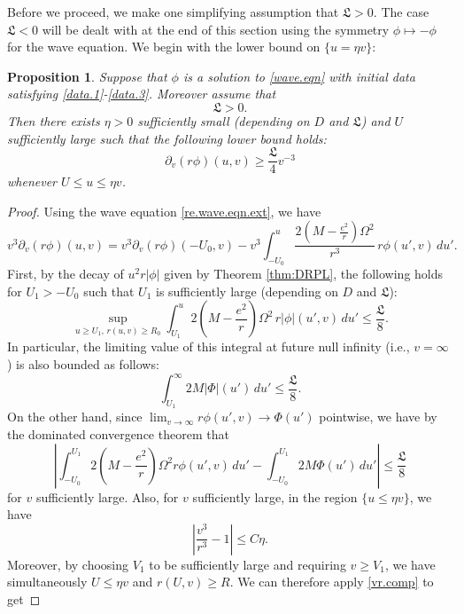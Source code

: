 \documentclass[12 pt, reqno]{amsart}
\newtheorem{proposition}[theorem]{Proposition}
\theoremstyle{definition}
\theoremstyle{remark}
\numberwithin{equation}{section}
\newcommand{\rd}{\partial}
\newcommand{\0}{\emptyset}
\newcommand{\Omg}{\Omega}
\newcommand{\f}{\frac}
\begin{document}
Before we proceed, we make one simplifying assumption that $\mathfrak L>0$. The case $\mathfrak L<0$ will be dealt with at the end of this section using the symmetry $\phi\mapsto -\phi$ for the wave equation. We begin with the lower bound on $\{u=\eta v\}$:
\begin{proposition}\label{decay.far}
Suppose that $\phi$ is a solution to \eqref{wave.eqn} with initial data satisfying \eqref{data.1}-\eqref{data.3}. Moreover assume that 
$$\mathfrak L> 0.$$
Then there exists $\eta>0$ sufficiently small (depending on $D$ and $\mathfrak L$) and $U$ sufficiently large such that the following lower bound holds:
$$\rd_v(r\phi)(u,v)\geq  \f{\mathfrak L}{4} v^{-3}$$
whenever $U\leq u\leq \eta v$.
\end{proposition}
\begin{proof}
Using the wave equation \eqref{re.wave.eqn.ext}, we have
\begin{equation}\label{decay.far.0}
v^3\rd_v(r\phi)(u,v)=v^3\rd_v(r\phi)({-U_0},v)-v^3\int_{-U_0}^u \f{2(M-\f{e^2}{r})\Omg^2}{r^3} \, r \phi (u',v)\,du'.
\end{equation}
First, by the decay of $u^2r|\phi|$ given by Theorem \ref{thm:DRPL}, the following holds for $U_1>{-U_0}$ such that $U_1$ is sufficiently large (depending on $D$ and $\mathfrak L$):
\begin{equation}\label{decay.far.est.1}
\sup_{u\geq U_1,\, r(u,v)\geq R_0}\int_{U_1}^{u} 2(M-\f{e^2}{r})\Omg^2 \, r |\phi| (u',v)\,du'\leq \f{\mathfrak L}{8}.
\end{equation}
In particular, the limiting value of this integral at future null infinity (i.e., $v=\infty$) is also bounded as follows:
\begin{equation}\label{decay.far.est.2}
\int_{U_1}^\infty 2M |\Phi|(u')  \,du' \leq \f{\mathfrak L}{8}.
\end{equation}
On the other hand, since $\lim_{v\to \infty} r\phi(u',v)\to \Phi(u')$ pointwise, we have by the dominated convergence theorem that 
\begin{equation}\label{decay.far.est.3}
|\int_{-U_0}^{U_1} 2(M-\f{e^2}{r})\Omg^2 r \phi(u',v)\,du'-\int_{-U_0}^{U_1} 2 M \Phi (u')  \,du'|\leq \f{\mathfrak L}{8}
\end{equation}
for $v$ sufficiently large.
Also, for $v$ sufficiently large, in the region $\{u\leq \eta v\}$, we have
\begin{equation}\label{vr.comp}
|\f{v^3}{r^3}-1|\leq C\eta.
\end{equation}
Moreover, by choosing $V_1$ to be sufficiently large and requiring $v\geq V_1$, we have simultaneously $U\leq \eta v$ and $r(U,v)\geq R$. We can therefore apply \eqref{vr.comp} to get

\end{proof}
\end{document}

